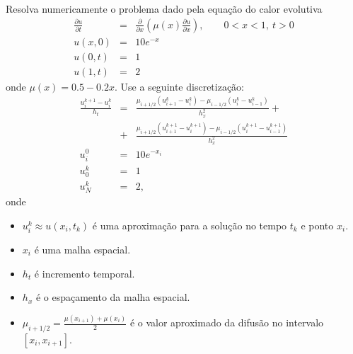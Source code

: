 \begin{exer}
Resolva numericamente o problema dado pela equação do calor evolutiva
\begin{eqnarray*}
\frac{\partial u}{\partial t}&=&\frac{\partial}{\partial x}\left(\mu(x)\frac{\partial u}{\partial x}\right),\qquad 0<x<1,\ t>0\\
u(x,0)&=&10e^{-x}\\
u(0,t)&=&1\\
u(1,t)&=&2
\end{eqnarray*}
onde $\mu(x)=0.5 - 0.2x$. Use a seguinte discretização:
\begin{eqnarray*}
\frac{u^{k+1}_i-u^{k}_i}{h_t}&=&\frac{\mu_{i+1/2}\left(u^{k}_{i+1}-u^{k}_i\right)-\mu_{i-1/2}\left(u^{k}_{i}-u^{k}_{i-1}\right)}{h_x^2}+\\
&+&\frac{\mu_{i+1/2}\left(u^{k+1}_{i+1}-u^{k+1}_i\right)-\mu_{i-1/2}\left(u^{k+1}_{i}-u^{k+1}_{i-1}\right)}{h_x^2}\\
u_i^0&=&10e^{-x_i}\\
u_0^{k}&=&1\\
u_N^{k}&=&2,
\end{eqnarray*}
onde
\begin{itemize}
 \item $u^k_i\approx u(x_i,t_k)$ é uma aproximação para a solução no tempo $t_k$ e ponto $x_i$.
 \item $x_i$ é uma malha espacial.
 \item $h_t$ é incremento temporal.
 \item $h_x$ é o espaçamento da malha espacial.
 \item $\mu_{i+1/2}=\frac{\mu(x_{i+1})+\mu(x_i)}{2}$ é o valor aproximado da difusão no intervalo $[x_i,x_{i+1}]$.
\end{itemize}
\end{exer}